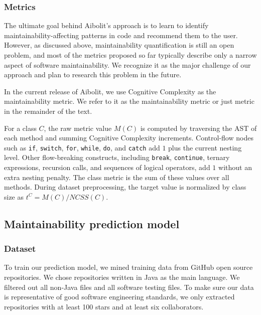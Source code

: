 \subsubsection*{Metrics}

The ultimate goal behind Aibolit's approach is to
learn to identify maintainability-affecting patterns in code and recommend them
to the user. However, as discussed above, maintainability quantification is
still an open problem, and most of the metrics proposed so far typically
describe only a narrow aspect of software maintainability. We recognize it as
the major challenge of our approach and plan to research this problem in the
future.

In the current release of Aibolit, we use Cognitive Complexity \citep{10.1145/3194164.3194186} as
the maintainability metric. We refer to it as the maintainability metric or just
metric in the remainder of the text.

For a class $C$, the raw metric value $M(C)$ is computed by traversing the AST
of each method and summing Cognitive Complexity increments. Control-flow nodes
such as \texttt{if}, \texttt{switch}, \texttt{for}, \texttt{while},
\texttt{do}, and \texttt{catch} add $1$ plus the current nesting level.
Other flow-breaking constructs, including \texttt{break}, \texttt{continue},
ternary expressions, recursion calls, and sequences of logical operators, add
$1$ without an extra nesting penalty. The class metric is the sum of these
values over all methods. During dataset preprocessing, the target value is
normalized by class size as $t^C = M(C) / \textit{NCSS}(C)$.

\subsection{Maintainability prediction model}

\label{sec:maint_pred_model}

\subsubsection*{Dataset}

\label{sec:dataset}

To train our prediction model, we mined training data
from GitHub open source repositories. We chose repositories written in Java
as the main language. We filtered out all non-Java files and all software
testing files. To make sure our data is
representative of good software engineering standards, we only extracted
repositories with at least 100 stars and at least six collaborators.

